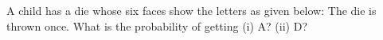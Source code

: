 A child has a die whose six faces show the letters as given below:
The die is thrown once. What is the probability of getting (i) A? (ii) D?
